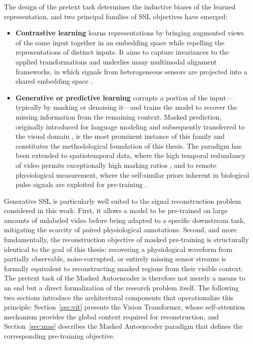 The design of the pretext task determines the inductive biases of the learned
representation, and two principal families of SSL objectives have emerged:
\begin{itemize}
    \item \textbf{Contrastive learning} learns representations by bringing
        augmented views of the same input together in an embedding space while
        repelling the representations of distinct inputs. It aims to capture
        invariances to the applied transformations and underlies many multimodal
        alignment frameworks, in which signals from heterogeneous sensors are
        projected into a shared embedding space \cite{girdhar2023imagebind}.

    \item \textbf{Generative or predictive learning} corrupts a portion of the
        input---typically by masking or denoising it---and trains the model to
        recover the missing information from the remaining context. Masked
        prediction, originally introduced for language modeling
        \cite{devlin-etal-2019-bert} and subsequently transferred to the visual
        domain \cite{he2022masked}, is the most prominent instance of this
        family and constitutes the methodological foundation of this thesis.
        The paradigm has been extended to spatiotemporal data, where the high
        temporal redundancy of video permits exceptionally high masking ratios
        \cite{tong2022videomae}, and to remote physiological measurement, where
        the self-similar priors inherent in biological pulse signals are
        exploited for pre-training \cite{liu2023rppgmae}.
\end{itemize}

Generative SSL is particularly well suited to the signal reconstruction problem
considered in this work. First, it allows a model to be pre-trained on large
amounts of unlabeled video before being adapted to a specific downstream task,
mitigating the scarcity of paired physiological annotations. Second, and more
fundamentally, the reconstruction objective of masked pre-training is
structurally identical to the goal of this thesis: recovering a physiological
waveform from partially observable, noise-corrupted, or entirely missing sensor
streams is formally equivalent to reconstructing masked regions from their
visible context. The pretext task of the Masked Autoencoder is therefore not
merely a means to an end but a direct formalization of the research problem
itself. The following two sections introduce the architectural components that
operationalize this principle: Section~\ref{sec:vit} presents the Vision
Transformer, whose self-attention mechanism provides the global context required
for reconstruction, and Section~\ref{sec:mae} describes the Masked Autoencoder
paradigm that defines the corresponding pre-training objective.

